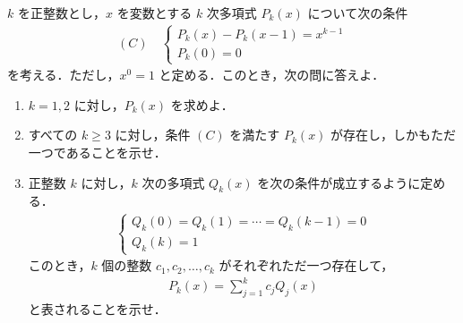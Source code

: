\documentclass[../../main.tex]{subfiles}
\begin{document}
$k$ を正整数とし，$x$ を変数とする $k$ 次多項式 $P_k(x)$ について次の条件
\begin{align}
  (C) \quad
  \begin{cases}
    P_k(x) - P_k(x-1) = x^{k-1} \\
    P_k(0) = 0
  \end{cases}
\end{align}
を考える．ただし，$x^0 = 1$ と定める．このとき，次の問に答えよ．
\begin{enumerate}
  \item $k = 1, 2$ に対し，$P_k(x)$ を求めよ．
  \item すべての $k \ge 3$ に対し，条件 $(C)$ を満たす $P_k(x)$ が存在し，しかもただ一つであることを示せ．
  \item 正整数 $k$ に対し，$k$ 次の多項式 $Q_k(x)$ を次の条件が成立するように定める．
    \begin{align}
      \begin{cases}
        Q_k(0) = Q_k(1) = \cdots = Q_k(k-1) = 0 \\
        Q_k(k) = 1
      \end{cases}
    \end{align}
    このとき，$k$ 個の整数 $c_1, c_2, \dots, c_k$ がそれぞれただ一つ存在して，
    \begin{align}
      P_k(x) = \sum_{j=1}^k c_j Q_j(x)
    \end{align}
    と表されることを示せ．
\end{enumerate}
\end{document}
